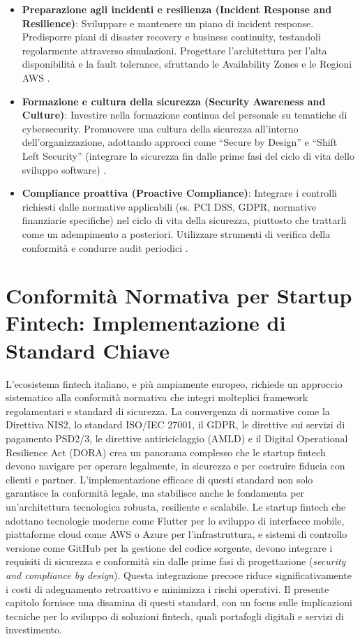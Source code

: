 \begin{itemize}
    \item \textbf{Preparazione agli incidenti e resilienza (Incident Response and Resilience)}: Sviluppare e mantenere un piano di incident response. Predisporre piani di disaster recovery e business continuity, testandoli regolarmente attraverso simulazioni. Progettare l'architettura per l'alta disponibilità e la fault tolerance, sfruttando le Availability Zones e le Regioni AWS \cite{awsWellArchitected}.
    \item \textbf{Formazione e cultura della sicurezza (Security Awareness and Culture)}: Investire nella formazione continua del personale su tematiche di cybersecurity. Promuovere una cultura della sicurezza all'interno dell'organizzazione, adottando approcci come \enquote{Secure by Design} e \enquote{Shift Left Security} (integrare la sicurezza fin dalle prime fasi del ciclo di vita dello sviluppo software) \cite{netguru2023}.
    \item \textbf{Compliance proattiva (Proactive Compliance)}: Integrare i controlli richiesti dalle normative applicabili (es. PCI DSS, GDPR, normative finanziarie specifiche) nel ciclo di vita della sicurezza, piuttosto che trattarli come un adempimento a posteriori. Utilizzare strumenti di verifica della conformità e condurre audit periodici \cite{netguru2023}.
\end{itemize}

\chapter{Conformità Normativa per Startup Fintech: Implementazione di Standard Chiave}
\label{chap:compliance}

L'ecosistema fintech italiano, e più ampiamente europeo, richiede un approccio sistematico alla conformità normativa che integri molteplici framework regolamentari e standard di sicurezza. La convergenza di normative come la Direttiva NIS2, lo standard ISO/IEC 27001, il GDPR, le direttive sui servizi di pagamento PSD2/3, le direttive antiriciclaggio (AMLD) e il Digital Operational Resilience Act (DORA) crea un panorama complesso che le startup fintech devono navigare per operare legalmente, in sicurezza e per costruire fiducia con clienti e partner. L'implementazione efficace di questi standard non solo garantisce la conformità legale, ma stabilisce anche le fondamenta per un'architettura tecnologica robusta, resiliente e scalabile. Le startup fintech che adottano tecnologie moderne come Flutter per lo sviluppo di interfacce mobile, piattaforme cloud come AWS o Azure per l'infrastruttura, e sistemi di controllo versione come GitHub per la gestione del codice sorgente, devono integrare i requisiti di sicurezza e conformità sin dalle prime fasi di progettazione (\textit{security and compliance by design}). Questa integrazione precoce riduce significativamente i costi di adeguamento retroattivo e minimizza i rischi operativi. Il presente capitolo fornisce una disamina di questi standard, con un focus sulle implicazioni tecniche per lo sviluppo di soluzioni fintech, quali portafogli digitali e servizi di investimento.


